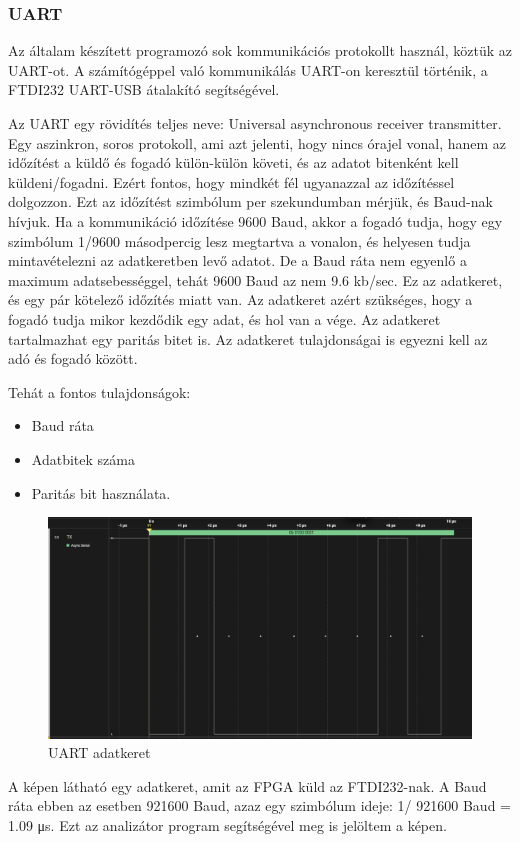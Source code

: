 \documentclass[a4paper,12pt,oneside]{book}
\begin{document}
\subsubsection{UART}
Az általam készített programozó sok kommunikációs protokollt használ, köztük az UART-ot. A számítógéppel való kommunikálás UART-on keresztül történik, a FTDI232 UART-USB átalakító segítségével.

Az UART egy rövidítés teljes neve: Universal asynchronous receiver transmitter. Egy aszinkron, soros protokoll, ami azt jelenti, hogy nincs órajel vonal, hanem az időzítést a küldő és fogadó külön-külön követi, és az adatot bitenként kell küldeni/fogadni. Ezért fontos, hogy mindkét fél ugyanazzal az időzítéssel dolgozzon. Ezt az időzítést szimbólum per szekundumban mérjük, és Baud-nak hívjuk. Ha a kommunikáció időzítése 9600 Baud, akkor a fogadó tudja, hogy egy szimbólum 1/9600 másodpercig lesz megtartva a vonalon, és helyesen tudja mintavételezni az adatkeretben levő adatot. De a Baud ráta nem egyenlő a maximum adatsebességgel, tehát 9600 Baud az nem 9.6 kb/sec. Ez az adatkeret, és egy pár kötelező időzítés miatt van. Az adatkeret azért szükséges, hogy a fogadó tudja mikor kezdődik egy adat, és hol van a vége. Az adatkeret tartalmazhat egy paritás bitet is. Az adatkeret tulajdonságai is egyezni kell az adó és fogadó között.

Tehát a fontos tulajdonságok:
\begin{itemize}
	\item Baud ráta
	\item Adatbitek száma 
	\item Paritás bit használata.
\end{itemize}
\begin{figure}[H]
	\centering
	\includegraphics[trim=1mm 1mm 1mm 1mm,scale=0.35]{UARTfromAnalyzer.PNG}
	\caption{UART adatkeret}
	\label{UARTkep}
\end{figure}
A képen látható egy adatkeret, amit az FPGA küld az FTDI232-nak. A Baud ráta ebben az esetben 921600 Baud, azaz egy szimbólum ideje: 1/ 921600 Baud = 1.09 μs. Ezt az analizátor program segítségével meg is jelöltem a képen.
\end{document}
